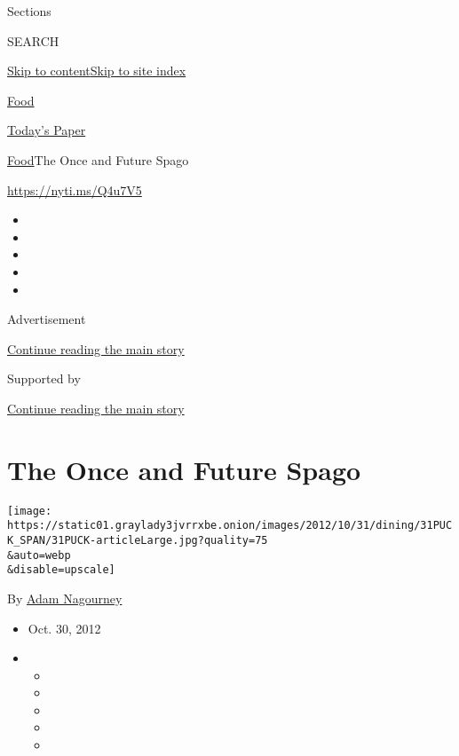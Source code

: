 Sections

SEARCH

\protect\hyperlink{site-content}{Skip to
content}\protect\hyperlink{site-index}{Skip to site index}

\href{https://www.nytimes3xbfgragh.onion/section/food}{Food}

\href{https://myaccount.nytimes3xbfgragh.onion/auth/login?response_type=cookie\&client_id=vi}{}

\href{https://www.nytimes3xbfgragh.onion/section/todayspaper}{Today's
Paper}

\href{/section/food}{Food}\textbar{}The Once and Future Spago

\url{https://nyti.ms/Q4u7V5}

\begin{itemize}
\item
\item
\item
\item
\item
\end{itemize}

Advertisement

\protect\hyperlink{after-top}{Continue reading the main story}

Supported by

\protect\hyperlink{after-sponsor}{Continue reading the main story}

\hypertarget{the-once-and-future-spago}{%
\section{The Once and Future Spago}\label{the-once-and-future-spago}}

\texttt{[image: https://static01.graylady3jvrrxbe.onion/images/2012/10/31/dining/31PUCK\_SPAN/31PUCK-articleLarge.jpg?quality=75\\\&auto=webp\\\&disable=upscale]}

By \href{https://www.nytimes3xbfgragh.onion/by/adam-nagourney}{Adam
Nagourney}

\begin{itemize}
\item
  Oct. 30, 2012
\item
  \begin{itemize}
  \item
  \item
  \item
  \item
  \item
  \end{itemize}
\end{itemize}

